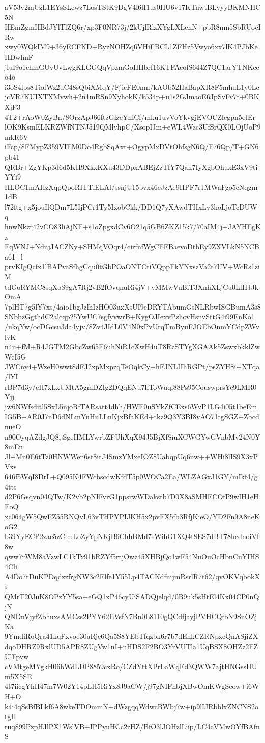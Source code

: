 aV53v2mUzL1EYsSLcwz7LosTStK9DgV4l6fI1us0HU6v17KTnwtBLyyyBKMNHC5N
HEmZgmHBdJYlTlZQ6r/xp3F0NR73j/2kUjlRlzXYgLXLenN+pbR8nm5SbRUocIRw
xwy0WQkIM9+36yECFKD+RyzNOHZq6VHiFBCL1ZFHz5Vwyo6xx7lK4PJbKeHDwlmF
jluI9o1chmGUvUvLwgKLGGQqVpzmGoHHbrf16KTFAcofS644Z7QC1arYTNKceo4o
i3oS4lps8TiofWz2uC48sQbiXMqY/FjicFE0mn/kAOb52HaBapXR8F5mhuL1y0Lc
jcVR7KUIXTXMvwh+2n1mRSn9XyhokK/k534p+u1s2GJmaoE6JpSvFv7t+0BKXjP3
4T2+rAoW0ZyBn/8OrzApJ66ftzGlzcYhlCf/mku1uvVoYkvgjEVOCZlcgpn5qlEr
lOK9KsmELKRZWfNTNJ519QMlyhpC/XsopIJm+eWL4Wzc3UfSrQX0LOjUoP9mkR6V
iFcp/8FMypZ359VIEM0Do4RgbSqAxr+OgypMxDVtOhfsgN6Q/F76Qp/T+GN6pb41
QRBr+ZgYKp3d6d5KH9XkxKXu43DDpxABEjZzTfY7Qan7IyXgbOhuxE3xV9tiYYi9
HLOC1mAHzXqpQpoRITTlELAl/ssnjU15bvx46eJzAe9HPF7rJMWaFgo5cNqgm1dB
l72ftg+x5jouIlQDm7L5IjPCr1Ty5IxobCkk/DD1Q7yXAwdTHxLy3hoLjoTcDUWq
hnwNkzr42vCO83liAjNE+s1oZpgxdCv6O21q5GB6ZKZ15k7/70aIM4j+JAYHEgKz
FqWNJ+NdnjJACZNy+SHMqVOqr4/cirfnfWgCEFBaevoDtbEy9ZXVLkN5NCBa61+l
prvKIgQcfx1lBAPvaSfhgCqu0tGbPOaONTCtiVQppFkYNxszVa2t7UV+WcRs1ziM
tdGoRYMC8sqXoS9gA7Rj2vB2fOvqnuRi4jV+vMMwVuBiT3XnhXLjCu0LlHJJkOmA
7plHT7g5lY7xs/4aio1bgJzlhIzHO03uxXsUI9eDRYTAbumGsNLRbwISGBumA3s8
SNbbzGgthdC2alcqp25YwUC7sgfyvwrB+KygOJIexvPzhovHsnvSttG4i99EnKo1
/ukqYw/ocDGcsu3da4yjv/8Zv4JIdL0V4N0xPvUrqTmByuFJOEbOnmYCdpZWvlvK
n4u+fM+R4JGTM2GbcZw65E6uhNiR1cXwH4uT8RzSTYgXGAAk5ZswxbkklZwWcI5G
JWCny4+WzeH0wwt8dFJ2xpMxpzqTeOqkCy+hFJNLIIhRGPt/psZYH8i+XTqa/lYI
rBP7d3y/cH7xLxUMtA5gmDZIg2DQqENu7hToWuql88Ps95CouswprsYc9LMR0Yjj
jw6NWfsditl5SxL5njoRfTARsatt4dhh/HWE0uSYkZfCExs6WvP1LG4i05t1beEm
IG5B+AR0J7nD6dNLmYuHuLLnKjxBfaKEd+tkz9Q3Y3BI8vAO71tgSGZ+ZbcdnueO
n90OyqAZdgJQ8ijSgeHMLYwrbZFUhXqX94J5BjXfSiuXCWGYwGVnbMv24N0Y8mEn
Jl+Mn0E6tTz0HNWWen6st8itJ4SmzYMxeIOZ8UabqpUq6uw++WHi8lIS9X3xPVxs
646f5WqI8DrL+Q095K4FWcbscdwKfdT5p0WOCa2Ea/WLZAGxJ1GY/mIkf4/g4tts
d2P6Gsqvn04QTw/K2vb2pNIFvrG1ppsrwWDakstb7D0X8aSMHECOfP9wIH1eHEoQ
xc064gW5QwFZ55RNQvL63vTHPYPIJKH5x2pvFX5fb3RfjKieO/YD2Fn9A8neKoG2
b39YyECP2zac5zClmLoZyYpNKjB6ChhBMd7sWihG1XQ4t8ES7dBT78hcdnoiVf8w
qww7rWM8aVzwLC1kTx91bRZYf5rtjOwz45XHBjQo1wF54NuOuOcHbnCuYIHS4Cli
A4Do7rDuKPDqdzzfrgNW3c2Elfe1Y55Lp4TACKdfmjmRsrlR7t62/qvOKVqbokXs
QMrT20JuK8OPzYY5sa+eGQ1xP46cyUiSADQjelqd/0B9uk5sHtEl4Kx04CP0nQjN
QNDnVjyfZbhuxsAMCss2PYY62EVsfN7Bn0L8110gQCdfjayjPVHCQfbN9SnOZjKa
9YmdiRoQra41kqFxvoe30aRje6Qa5S8YEbTfqzbk6r7b7dEnkCZRNpxcQnASjiZX
dqoDHRZ9RxlUD5APR8ZUgVw1nI+nHDS2F2BO3YrVUTla1UqBSX8OHZz2FZUlFpvw
cVMtgeMYgkH06bWdLDP8859cxRo/CZdYttXPrLaWqEd3QWW7ajtHNGssDUm5X5SE
4t7iicgYhH47m7W02Y14pLH5RiYx8J9aCW/j97gNIFhbjXBwOmKWgScow+i6WH+O
k4i4qSsBfBLkf6A8wkeTDOmmN+dWzgqqWdwcBWbj7w+ip9lIJRbblxZNCNS2otgH
ruq899PzpHJlPX1WslVB+IPPyuHCc2zHZ/BfO3lJOHzlI7ip/LC4cVMwOYfBAfnS
